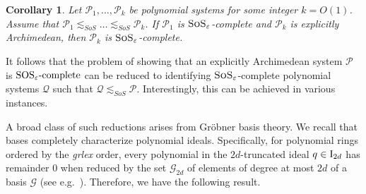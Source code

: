 \documentclass[11pt]{article}
\newcommand{\sos}{\text{\sc{SoS}}}
\newcommand{\grlexns}{\textsf{grlex}}
\newcommand{\I}{\emph{$\rm{I}$}}
\newcommand{\1}{\textbf{1}}
\newcommand{\GB}{\text{Gr\"{o}bner} }
\newtheorem{proposition}[theorem]{Proposition}
\newtheorem{corollary}[theorem]{Corollary}
\newcommand{\SOSe}{\rm{SOS}_\varepsilon\text{-complete}}
\begin{document}
\begin{corollary}\label{cor:completeness_inheritance}
    Let $\mathcal{P}_1, \dots, \mathcal{P}_k$ be polynomial systems for some integer $k = O(1)$. Assume that $\mathcal{P}_1 \lesssim_{SoS} \dots \lesssim_{SoS} \mathcal{P}_k$. If $\mathcal{P}_1$ is $\sos_{\varepsilon}$-complete and $\mathcal{P}_k$ is explicitly Archimedean, then $\mathcal{P}_k$ is $\sos_{\varepsilon}$-complete.
\end{corollary}


It follows that the problem of showing that an explicitly Archimedean system $\mathcal{P}$ is $\SOSe$ can be reduced to identifying $\sos_\varepsilon$-complete polynomial systems $\mathcal{Q}$ such that $\mathcal{Q} \lesssim_{SoS} \mathcal{P}$. Interestingly, this can be achieved in various instances.


A broad class of such reductions arises from Gröbner basis theory. We recall that \GB bases completely characterize polynomial ideals. Specifically, for polynomial rings ordered by the \emph{\grlexns} order, every polynomial in the $2d$-truncated ideal $q \in \I_{2d}$ has remainder 0 when reduced by the set $\mathcal{G}_{2d}$ of elements of degree at most $2d$ of a \GB basis $\mathcal{G}$ (see e.g.~\cite{Cox}). Therefore, we have the following result.
\end{document}
